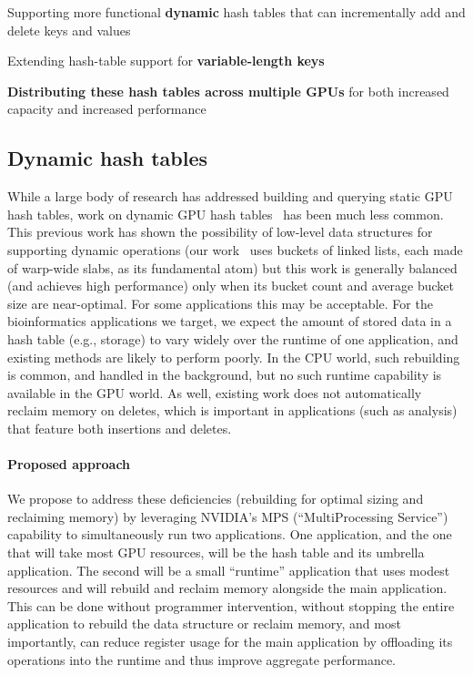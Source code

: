 \begin{rproblem}
  Supporting more functional \textbf{dynamic} hash tables that can incrementally add and delete keys and values
  \label{rprob:dynamic-gpu-hashtable}
\end{rproblem}

\begin{rproblem}
  Extending hash-table support for \textbf{variable-length keys}
  \label{rprob:variable-hashtable}
\end{rproblem}

\begin{rproblem}
  \textbf{Distributing these hash tables across multiple GPUs} for both increased capacity and increased performance
  \label{rprob:dist-hashtable}
\end{rproblem}

\subsection{Dynamic hash tables}

While a large body of research has addressed building and querying static GPU hash tables, work on dynamic GPU hash tables~\cite{Ashkiani:2018:ADH,Junger:2020:WAL,Li:2021:DDH,Zhou:2021:DAD} has been much less common. This previous work has shown the possibility of low-level data structures for supporting dynamic operations (our work~\cite{Ashkiani:2018:ADH} uses buckets of linked lists, each made of warp-wide slabs, as its fundamental atom) but this work is generally balanced (and achieves high performance) only when its bucket count and average bucket size are near-optimal. For some applications this may be acceptable. For the bioinformatics applications we target, we expect the amount of stored data in a hash table (e.g., \kmer storage) to vary widely over the runtime of one application, and existing methods are likely to perform poorly. In the CPU world, such rebuilding is common, and handled in the background, but no such runtime capability is available in the GPU world. As well, existing work does not automatically reclaim memory on deletes, which is important in applications (such as \kmer analysis) that feature both insertions and deletes.

\paragraph{Proposed approach}

We propose to address these deficiencies (rebuilding for optimal sizing and reclaiming memory) by leveraging NVIDIA's MPS (``MultiProcessing Service'') capability to simultaneously run two applications. One application, and the one that will take most GPU resources, will be the hash table and its umbrella application. The second will be a small ``runtime'' application that uses modest resources and will rebuild and reclaim memory alongside the main application. This can be done without programmer intervention, without stopping the entire application to rebuild the data structure or reclaim memory, and most importantly, can reduce register usage for the main application by offloading its operations into the runtime and thus improve aggregate performance.

